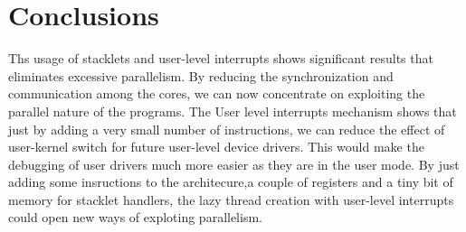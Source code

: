 \section{Conclusions}

Ths usage of stacklets and user-level interrupts shows significant results
that eliminates excessive parallelism. By reducing the synchronization and
communication among the cores, we can now concentrate on exploiting the
parallel nature of the programs. The User level interrupts mechanism shows
that just by adding a very small number of instructions, we can reduce the
effect of user-kernel switch for future user-level device drivers. This would
make the debugging of user drivers much more easier as they are in the user
mode. By just adding some insructions to the architecure,a couple of registers
and a tiny bit of memory for stacklet handlers, the lazy thread creation with 
user-level interrupts could open new ways of exploting parallelism.

